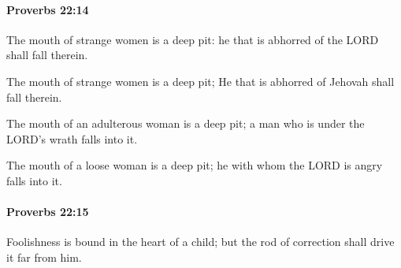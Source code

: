 		\paragraph{Proverbs 22:14} %
			\label{PROVERBS-22-14}

			The mouth of strange women is a deep pit: he that is abhorred of the LORD shall fall therein.

			\begin{versebox}
					\item[BHS] 
					\item[ASV] The mouth of strange women is a deep pit; He that is abhorred of Jehovah shall fall therein.
					\item[NIV] The mouth of an adulterous woman is a deep pit; a man who is under the LORD’s wrath falls into it.
					\item[NRSV] The mouth of a loose woman is a deep pit; he with whom the LORD is angry falls into it.
			\end{versebox}

		\paragraph{Proverbs 22:15} %
			\label{PROVERBS-22-15}

			Foolishness is bound in the heart of a child; but the rod of correction shall drive it far from him.

